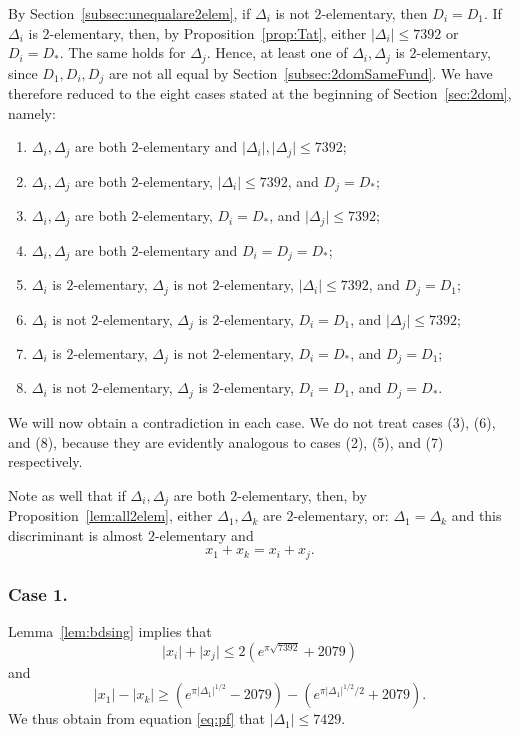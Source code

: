 \documentclass[12pt,a4paper,oneside]{amsart}
\begin{document}
By Section~\ref{subsec:unequalare2elem}, if $\Delta_i$ is not $2$-elementary, then $D_i = D_1$. If $\Delta_i$ is $2$-elementary, then, by Proposition~\ref{prop:Tat}, either $\lvert \Delta_i \rvert \leq 7392$ or $D_i = D_*$. The same holds for $\Delta_j$. Hence, at least one of $\Delta_i, \Delta_j$ is $2$-elementary, since $D_1, D_i, D_j$ are not all equal by Section~\ref{subsec:2domSameFund}. 
We have therefore reduced to the eight cases stated at the beginning of Section~\ref{sec:2dom}, namely:

\begin{enumerate}
	\item $\Delta_i, \Delta_j$ are both $2$-elementary and $\lvert \Delta_i \rvert, \lvert \Delta_j \rvert  \leq 7392$;
		\item $\Delta_i, \Delta_j$ are both $2$-elementary, $\lvert \Delta_i \rvert \leq 7392$, and $D_j = D_*$;
			\item $\Delta_i, \Delta_j$ are both $2$-elementary, $D_i = D_*$, and $\lvert \Delta_j \rvert \leq 7392$;
	\item $\Delta_i, \Delta_j$ are both $2$-elementary and $D_i = D_j = D_*$;
	\item $\Delta_i$ is $2$-elementary, $\Delta_j$ is not $2$-elementary, $\lvert \Delta_i \rvert \leq 7392$, and $D_j = D_1$;
	\item $\Delta_i$ is not $2$-elementary, $\Delta_j$ is $2$-elementary, $D_i = D_1$, and $\lvert \Delta_j \rvert \leq 7392$;
	\item $\Delta_i$ is $2$-elementary, $\Delta_j$ is not $2$-elementary, $D_i = D_*$, and $D_j = D_1$;
	\item  $\Delta_i$ is not $2$-elementary, $\Delta_j$ is $2$-elementary, $D_i = D_1$, and $D_j = D_*$.
\end{enumerate}


We will now obtain a contradiction in each case. We do not treat cases (3), (6), and (8), because they are evidently analogous to cases (2), (5), and (7) respectively. 

Note as well that if $\Delta_i, \Delta_j$ are both $2$-elementary, then, by Proposition~\ref{lem:all2elem},  either $\Delta_1, \Delta_k$ are $2$-elementary, or: $\Delta_1 = \Delta_k$ and this discriminant is almost $2$-elementary and  
\[ x_1 + x_k = x_i + x_j.\]

\subsubsection{Case 1.}\label{subsub:2domcase1} Lemma~\ref{lem:bdsing} implies that
\[ \lvert x_i \rvert + \lvert x_j \rvert \leq 2(e^{\pi \sqrt{7392}}+2079)\]
and
\[ \lvert x_1 \rvert - \lvert x_k \rvert \geq (e^{\pi \lvert \Delta_1 \rvert^{1/2}} - 2079) - (e^{\pi \lvert \Delta_1 \rvert^{1/2}/2} + 2079).\]
We thus obtain from equation \eqref{eq:pf} that $\lvert \Delta_1 \rvert \leq 7429$.
\end{document}
